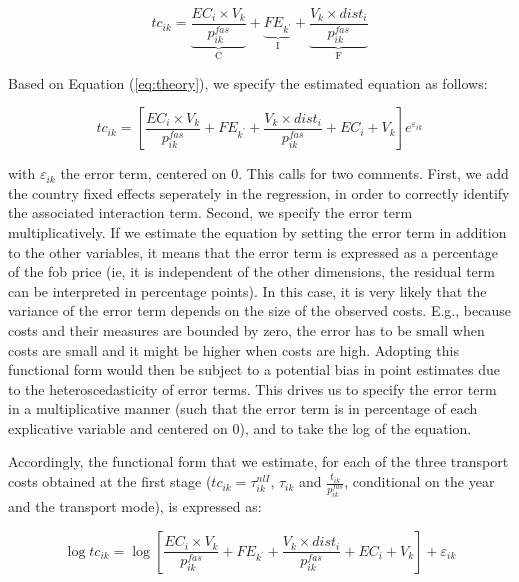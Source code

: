 \documentclass[a4paper,11pt]{article}
\begin{document}
\begin{equation}
tc_{ik} = \underbrace{\frac{EC_i\times V_{k}}{p^{fas}_{ik}}}_{\text{C}} + \underbrace{FE_{k^\prime}}_{\text{I}}+ \underbrace{\frac{V_k\times dist_i}{p_{ik}^{fas}}}_{\text{F}} \label{eq:theory}
\end{equation}

Based on Equation (\ref{eq:theory}), we specify the estimated equation as follows:

\begin{equation}
tc_{ik} = \left[\frac{EC_i\times V_k}{p^{fas}_{ik}} + FE_{k^\prime}+ \frac{V_k\times dist_i}{p_{ik}^{fas}} + EC_i + V_k\right]e^{\varepsilon_{ik}} \label{eq:estim}
\end{equation}

with $\varepsilon_{ik}$ the error term, centered on 0. This calls for two comments. First, we add the country fixed effects seperately in the regression, in order to correctly identify the associated interaction term. Second, we specify the error term multiplicatively. If we estimate the equation by setting the error term in addition to the other variables, it means that the error term is expressed as a percentage of the fob price (ie, it is independent of the other dimensions, the residual term can be interpreted in percentage points). In this case, it is very likely that the variance of the error term depends on the size of the observed costs. E.g., because costs and their measures are bounded by zero, the error has to be small when costs are small and it might be higher when costs are high. Adopting this functional form would then be subject to a potential bias in point estimates due to the heteroscedasticity of error terms. This drives us to specify the error term in a multiplicative manner (such that the error term is in percentage of each explicative variable and centered on 0), and to take the log of the equation.

Accordingly, the functional form that we estimate, for each of the three transport costs obtained at the first stage ($tc_{ik} = \tau^{nlI}_{ik}$, $\tau_{ik}$ and $\frac{t_{ik}}{p^{fas}_{ik}}$, conditional on the year and the transport mode), is expressed as:

\begin{equation}
\log tc_{ik} = \log\left[\frac{EC_i\times V_{k}}{p^{fas}_{ik}} + FE_{k^\prime}+ \frac{V_k\times dist_i}{p_{ik}^{fas}} + EC_i + V_k \right]+ \varepsilon_{ik} \label{eq:estim1}
\end{equation}
\end{document}
